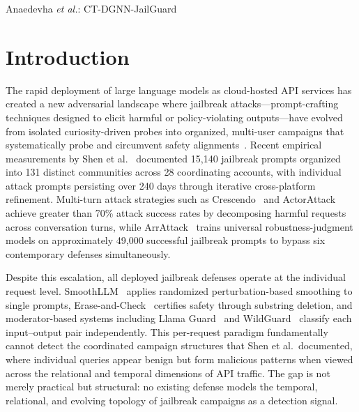 \documentclass[journal]{IEEEtran}
\theoremstyle{plain}
\theoremstyle{definition}
\theoremstyle{remark}
\begin{document}
%
{Anaedevha \MakeLowercase{\textit{et al.}}: CT-DGNN-JailGuard}

\section{Introduction}

The rapid deployment of large language models as cloud-hosted API services has created a new adversarial landscape where jailbreak attacks---prompt-crafting techniques designed to elicit harmful or policy-violating outputs---have evolved from isolated curiosity-driven probes into organized, multi-user campaigns that systematically probe and circumvent safety alignments~\cite{zou2023gcg, wei2023jailbroken}. Recent empirical measurements by Shen et al.~\cite{shen2024dan} documented 15,140 jailbreak prompts organized into 131 distinct communities across 28 coordinating accounts, with individual attack prompts persisting over 240 days through iterative cross-platform refinement. Multi-turn attack strategies such as Crescendo~\cite{russinovich2024crescendo} and ActorAttack~\cite{ren2024actorattack} achieve greater than 70\% attack success rates by decomposing harmful requests across conversation turns, while ArrAttack~\cite{li2025arrattack} trains universal robustness-judgment models on approximately 49,000 successful jailbreak prompts to bypass six contemporary defenses simultaneously.

Despite this escalation, all deployed jailbreak defenses operate at the individual request level. SmoothLLM~\cite{robey2024smoothllm} applies randomized perturbation-based smoothing to single prompts, Erase-and-Check~\cite{kumar2024erasecheck} certifies safety through substring deletion, and moderator-based systems including Llama Guard~\cite{inan2023llamaguard} and WildGuard~\cite{han2024wildguard} classify each input--output pair independently. This per-request paradigm fundamentally cannot detect the coordinated campaign structures that Shen et al.~documented, where individual queries appear benign but form malicious patterns when viewed across the relational and temporal dimensions of API traffic. The gap is not merely practical but structural: no existing defense models the temporal, relational, and evolving topology of jailbreak campaigns as a detection signal.
\end{document}
